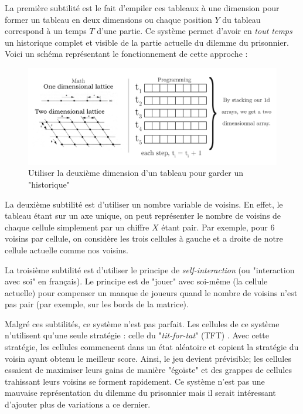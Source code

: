 \documentclass[a4paper, french]{article}
\begin{document}
La première subtilité est le fait d'empiler ces tableaux à une dimension pour former un tableau en deux dimensions ou chaque position $Y$ du tableau correspond à un temps $T$ d'une partie. Ce système permet d'avoir en \textit{tout temps} un historique complet et visible de la partie actuelle du dilemme du prisonnier. Voici un schéma représentant le fonctionnement de cette approche :

\begin{figure}[htp]
    \centering
    \includegraphics[width=\linewidth]{arrays.png}
    \caption{Utiliser la deuxième dimension d'un tableau pour garder un "historique"}
\end{figure}

La deuxième subtilité est d'utiliser un nombre variable de voisins. En effet, le tableau étant sur un axe unique, on peut représenter le nombre de voisins de chaque cellule simplement par un chiffre $X$ étant pair. Par exemple, pour 6 voisins par cellule, on considère les trois cellules à gauche et a droite de notre cellule actuelle comme nos voisins.

La troisième subtilité est d'utiliser le principe de \textit{self-interaction} (ou "interaction avec soi" en français). Le principe est de "jouer" avec soi-même (la cellule actuelle) pour compenser un manque de joueurs quand le nombre de voisins n'est pas pair (par exemple, sur les bords de la matrice).

Malgré ces subtilités, ce système n'est pas parfait. Les cellules de ce système n'utilisent qu'une seule stratégie : celle du "\textit{tit-for-tat}" (TFT) \cite{StratIPD}. Avec cette stratégie, les cellules commencent dans un état aléatoire et copient la stratégie du voisin ayant obtenu le meilleur score. Ainsi, le jeu devient prévisible; les cellules essaient de maximiser leurs gains de manière "égoïste" et des grappes de cellules trahissant leurs voisins se forment rapidement. Ce système n'est pas une mauvaise représentation du dilemme du prisonnier mais il serait intéressant d'ajouter plus de variations a ce dernier.
\end{document}
